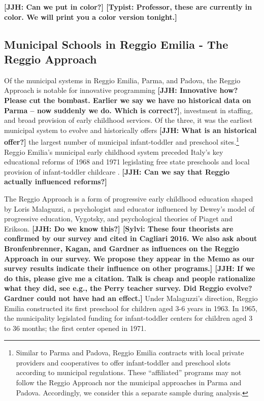 \textbf{[JJH: Can we put in color?] [Typist: Professor, these are currently in color. We will print you a color version tonight.]}


\subsection{Municipal Schools in Reggio Emilia - The Reggio Approach}

Of the municipal systems in Reggio Emilia, Parma, and Padova, the Reggio Approach is notable for innovative programming \textbf{[JJH: Innovative how? Please cut the bombast. Earlier we say we have no historical data on Parma -- now suddenly we do. Which is correct?]}, investment in staffing, and broad provision of early childhood services. Of the three, it was the earliest municipal system to evolve and historically offers \textbf{[JJH: What is an historical offer?]} the largest number of municipal infant-toddler and preschool sites.\footnote{Similar to Parma and Padova, Reggio Emilia contracts with local private providers and cooperatives to offer infant-toddler and preschool slots according to municipal regulations. These ``affiliated'' programs may not follow the Reggio Approach nor the municipal approaches in Parma and Padova. Accordingly, we consider this a separate sample during analysis.} Reggio Emilia's municipal early childhood system preceded Italy's key educational reforms of 1968 and 1971 legislating free state preschools and local provision of infant-toddler childcare \citep{Cagliari-etal-eds_2016_BOOK_Loris-Malaguzzi}. \textbf{[JJH: Can we say that Reggio actually influenced reforms?]}

The Reggio Approach is a form of progressive early childhood education shaped by Loris Malaguzzi, a psychologist and educator influenced by Dewey's model of progressive education, Vygotsky, and psychological theories of Piaget and Erikson. \textbf{[JJH: Do we know this?] [Sylvi: These four theorists are confirmed by our survey and cited in Cagliari 2016. We also ask about Bronfenbrenner, Kagan, and Gardner as influences on the Reggio Approach in our survey. We propose they appear in the Memo as our survey results indicate their influence on other programs.] [JJH: If we do this, please give me a citation. Talk is cheap and people rationalize what they did, see e.g., the Perry teacher survey. Did Reggio evolve? Gardner could not have had an effect.]} Under Malaguzzi's direction, Reggio Emilia constructed its first preschool for children aged 3-6 years in 1963. In 1965, the municipality legislated funding for infant-toddler centers for children aged 3 to 36 months; the first center opened in 1971.

